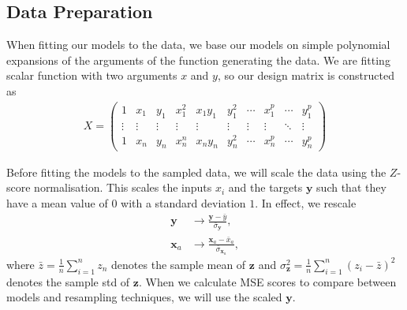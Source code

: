 \documentclass[twocolumn,english,notitlepage]{article}
\renewcommand{\vec}[1]{\boldsymbol{#1}}
\begin{document}
        \subsection{Data Preparation}
            When fitting our models to the data, we base our models on simple polynomial expansions of the arguments of the function generating the data. We are fitting scalar function with two arguments $x$ and $y$, so our design matrix is constructed as
            \begin{align} \label{met:eq:design_X}
                X = \begin{pmatrix}
                    1 & x_1 & y_1 & x^2_1 & x_1y_1 & y_1^2 & \cdots & x_1^p & \cdots & y_1^p \\
                    \vdots & \vdots & \vdots & \vdots & \vdots & \vdots & \vdots & \vdots & \ddots & \vdots \\
                    1 & x_n & y_n & x^n_n & x_ny_n & y_n^2 & \cdots & x_n^p & \cdots & y_n^p
                \end{pmatrix}
            \end{align}
        
            Before fitting the models to the sampled data, we will scale the data using the $Z$-score normalisation. This scales the inputs $x_i$ and the targets $\vec{y}$ such that they have a mean value of $0$ with a standard deviation $1$. In effect, we rescale
            \begin{subequations}
                \begin{align}
                    \vec{y} &\to \frac{\vec{y}-\bar{y}}{\bar{\sigma}_{\vec{y}}}, \\
                    \vec{x}_a &\to \frac{\vec{x}_a - \bar{x}_a}{\bar{\sigma}_{\vec{x}_a}},
                \end{align}
            \end{subequations}
            where $\bar{z} = \frac{1}{n} \sum_{i=1}^n z_n$ denotes the sample mean of $\vec{z}$ and $\sigma_{\vec{z}}^2 = \frac{1}{n} \sum_{i=1}^n {(z_i-\bar{z})}^2$ denotes the sample std of $\vec{z}$. When we calculate MSE scores to compare between models and resampling techniques, we will use the scaled $\vec{y}$.
\end{document}
